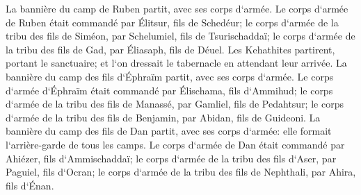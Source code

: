 \verse La bannière du camp de Ruben partit, avec ses corps d`armée. Le corps d`armée de Ruben était commandé par Élitsur, fils de Schedéur; 
\verse le corps d`armée de la tribu des fils de Siméon, par Schelumiel, fils de Tsurischaddaï; 
\verse le corps d`armée de la tribu des fils de Gad, par Éliasaph, fils de Déuel. 
\verse Les Kehathites partirent, portant le sanctuaire; et l`on dressait le tabernacle en attendant leur arrivée. 
\verse La bannière du camp des fils d`Éphraïm partit, avec ses corps d`armée. Le corps d`armée d`Éphraïm était commandé par Élischama, fils d`Ammihud; 
\verse le corps d`armée de la tribu des fils de Manassé, par Gamliel, fils de Pedahtsur; 
\verse le corps d`armée de la tribu des fils de Benjamin, par Abidan, fils de Guideoni. 
\verse La bannière du camp des fils de Dan partit, avec ses corps d`armée: elle formait l`arrière-garde de tous les camps. Le corps d`armée de Dan était commandé par Ahiézer, fils d`Ammischaddaï; 
\verse le corps d`armée de la tribu des fils d`Aser, par Paguiel, fils d`Ocran; 
\verse le corps d`armée de la tribu des fils de Nephthali, par Ahira, fils d`Énan. 
